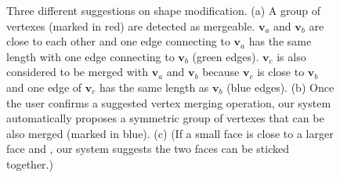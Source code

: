 \begin{figure}
	\centering
	 \hfill
	 \hfill
	 
	 \caption{Three different suggestions on shape modification. (a) A group of vertexes (marked in red) are detected as mergeable. $\mathbf{v}_a$ and $\mathbf{v}_b$ are close to each other and one edge connecting to $\mathbf{v}_a$ has the same length with one edge connecting to $\mathbf{v}_b$ (green edges). $\mathbf{v}_c$ is also considered to be merged with $\mathbf{v}_a$ and $\mathbf{v}_b$ because $\mathbf{v}_c$ is close to $\mathbf{v}_b$ and one edge of $\mathbf{v}_c$ has the same length as $\mathbf{v}_b$ (blue edges). (b) Once the user confirms a suggested vertex merging operation, our system automatically proposes a symmetric group of vertexes that can be also merged (marked in blue). (c) (If a small face is close to a larger face and , our system suggests the two faces can be sticked together.) {\color{blue}{If faces marked in red are detected close to each other and the same with their normals, our system suggests these faces can be sticked together.}}}
	 \label{fig:suggestion}
\end{figure}

